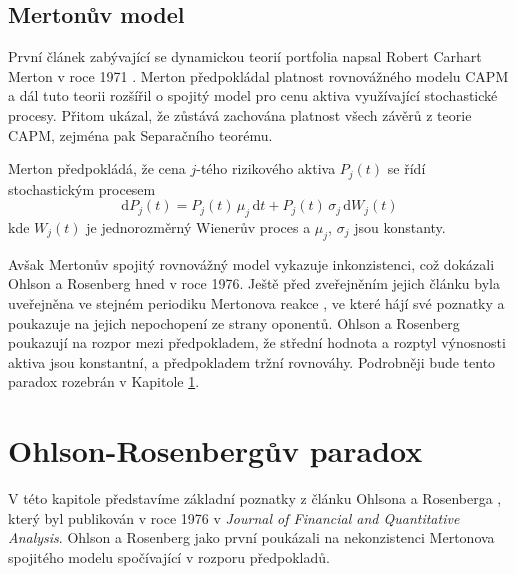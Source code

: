 \documentclass[a4paper,12pt]{report}
\theoremstyle{definition} \newtheorem{definice}[veta]{Definice}
\theoremstyle{remark}
\begin{document}
\subsection{Mertonův model}
První článek zabývající se dynamickou teorií portfolia napsal Robert Carhart Merton v roce 1971 \cite{merton1971}.
Merton předpokládal platnost rovnovážného modelu CAPM a dál tuto teorii rozšířil o spojitý model pro cenu aktiva využívající stochastické procesy.
Přitom ukázal, že zůstává zachována platnost všech závěrů z teorie CAPM, zejména pak Separačního teorému.

Merton předpokládá, že cena $j$-tého rizikového aktiva $P_j(t)$ se řídí stochastickým procesem
$$\mathrm{d}P_j(t)=P_j(t)\,\mu_j\,\mathrm{d}t+P_j(t)\,\sigma_j\,\mathrm{d}W_j(t)$$
kde $W_j(t)$ je jednorozměrný Wienerův proces a $\mu_j$, $\sigma_j$ jsou konstanty. 


Avšak Mertonův spojitý rovnovážný model vykazuje inkonzistenci, což dokázali Ohlson a Rosenberg \cite{ohlson} hned v roce 1976.
Ještě před zveřejněním jejich článku byla uveřejněna ve stejném periodiku Mertonova reakce \cite{merton1975}, ve které hájí své poznatky a poukazuje na jejich nepochopení ze strany oponentů.  
Ohlson a Rosenberg poukazují na rozpor mezi předpokladem, že střední hodnota a rozptyl výnosnosti aktiva jsou konstantní, a předpokladem tržní rovnováhy.
Podrobněji bude tento paradox rozebrán v Kapitole \ref{paradox}.


\section{Ohlson-Rosenbergův paradox}\label{paradox}
V této kapitole představíme základní poznatky z článku Ohlsona a Rosenberga \cite{ohlson}, který byl publikován v roce 1976 v \textit{Journal of Financial and Quantitative Analysis}.
Ohlson a Rosenberg jako první poukázali na nekonzistenci Mertonova spojitého modelu \cite{merton1971} spočívající v rozporu předpokladů.
\end{document}
